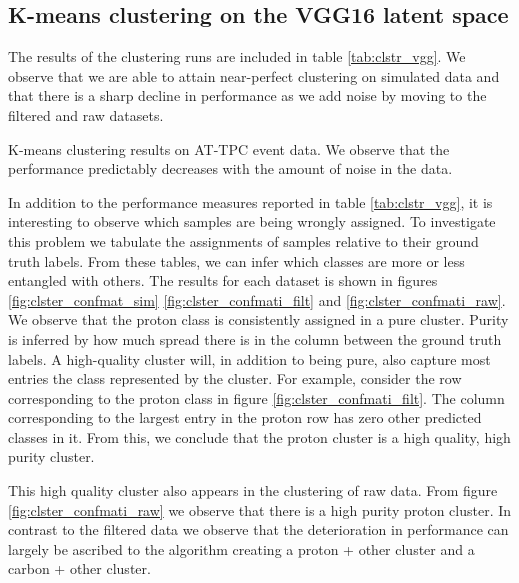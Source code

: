 \documentclass[review,number,sort&compress]{elsarticle}
\begin{document}
\subsection{K-means clustering on the VGG16 latent space}

The results of the clustering runs are included in table \ref{tab:clstr_vgg}. We observe that we are able to attain near-perfect clustering on simulated data and that there is a sharp decline in performance as we add noise by moving to the filtered and raw datasets. 


\begin{table}[H]
\centering 
\caption[K-means on pre-trained model]{K-means clustering results on AT-TPC event data. We observe that the performance predictably decreases with the amount of noise in the data.}\label{tab:clstr_vgg}

\end{table}

In addition to the performance measures reported in table \ref{tab:clstr_vgg}, it is interesting to observe which samples are being wrongly assigned. To investigate this problem we tabulate the assignments of samples relative to their ground truth labels. From these tables, we can infer which classes are more or less entangled with others. The results for each dataset is shown in figures \ref{fig:clster_confmat_sim} \ref{fig:clster_confmati_filt} and \ref{fig:clster_confmati_raw}. We observe that the proton class is consistently assigned in a pure cluster. Purity is inferred by how much spread there is in the column between the ground truth labels. A high-quality cluster will, in addition to being pure, also capture most entries the class represented by the cluster. For example, consider the row corresponding to the proton class in figure \ref{fig:clster_confmati_filt}. The column corresponding to the largest entry in the proton row has zero other predicted classes in it. From this, we conclude that the proton cluster is a high quality, high purity cluster. 

This high quality cluster also appears in the clustering of raw data. From figure \ref{fig:clster_confmati_raw} we observe that there is a high purity proton cluster. In contrast to the filtered data we observe that the deterioration in performance can largely be ascribed to the algorithm creating a proton + other cluster and a carbon + other cluster.
\end{document}
